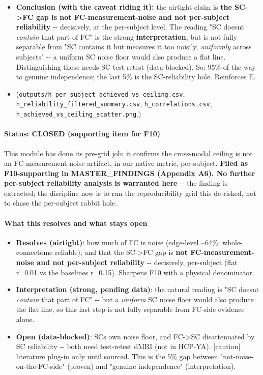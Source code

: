\begin{itemize}
\item
  \textbf{Conclusion (with the caveat riding it):} the airtight claim is \textbf{the SC-\textgreater FC gap is not FC-measurement-noise and not per-subject reliability} -\/- decisively, at the per-subject level. The reading "SC doesn\textquotesingle t \emph{contain} that part of FC" is the strong \textbf{interpretation}, but is not fully separable from "SC contains it but measures it too noisily, \emph{uniformly} across subjects" -\/- a uniform SC noise floor would also produce a flat line. Distinguishing those needs SC test-retest (data-blocked). So: 95\% of the way to genuine independence; the last 5\% is the SC-reliability hole. Reinforces E.
\item
  (\texttt{outputs/h\_per\_subject\_achieved\_vs\_ceiling.csv}, \texttt{h\_reliability\_filtered\_summary.csv}, \texttt{h\_correlations.csv}, \texttt{h\_achieved\_vs\_ceiling\_scatter.png}.)
\end{itemize}

\paragraph{Status: CLOSED (supporting item for F10)}\label{status-closed-supporting-item-for-f10}

This module has done its pre-grid job: it confirms the cross-modal ceiling is not an FC-measurement-noise artifact, in our native metric, per-subject. \textbf{Filed as F10-supporting in MASTER\_FINDINGS (Appendix A6). No further per-subject reliability analysis is warranted here} -\/- the finding is extracted; the discipline now is to run the reproducibility grid this de-risked, not to chase the per-subject rabbit hole.

\paragraph{What this resolves and what stays open}\label{what-this-resolves-and-what-stays-open}

\begin{itemize}
\tightlist
\item
  \textbf{Resolves (airtight)}: how much of FC is noise (edge-level \textasciitilde64\%; whole-connectome reliable), and that the SC-\textgreater FC gap is \textbf{not FC-measurement-noise and not per-subject reliability} -\/- decisively, per-subject (flat r=0.01 vs the baseline\textquotesingle s r=0.15). Sharpens F10 with a physical denominator.
\item
  \textbf{Interpretation (strong, pending data)}: the natural reading is "SC doesn\textquotesingle t \emph{contain} that part of FC" -\/- but a \emph{uniform} SC noise floor would also produce the flat line, so this last step is not fully separable from FC-side evidence alone.
\item
  \textbf{Open (data-blocked)}: SC\textquotesingle s own noise floor, and FC-\textgreater SC disattenuated by SC reliability -\/- both need test-retest dMRI (not in HCP-YA). {[}caution{]} literature plug-in only until sourced. This is the 5\% gap between "not-noise-on-the-FC-side" (proven) and "genuine independence" (interpretation).
\end{itemize}

